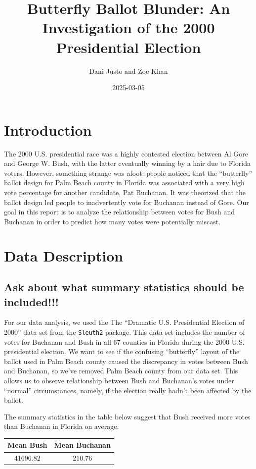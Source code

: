 \documentclass[
  letterpaper,
  DIV=11,
  numbers=noendperiod]{scrartcl}
\title{Butterfly Ballot Blunder: An Investigation of the 2000
Presidential Election}
\author{Dani Justo and Zoe Khan}
\date{2025-03-05}
\begin{document}
\maketitle

\section{Introduction}\label{introduction}

The 2000 U.S. presidential race was a highly contested election between
Al Gore and George W. Bush, with the latter eventually winning by a hair
due to Florida voters. However, something strange was afoot: people
noticed that the ``butterfly'' ballot design for Palm Beach county in
Florida was associated with a very high vote percentage for another
candidate, Pat Buchanan. It was theorized that the ballot design led
people to inadvertently vote for Buchanan instead of Gore. Our goal in
this report is to analyze the relationship between votes for Bush and
Buchanan in order to predict how many votes were potentially miscast.

\section{Data Description}\label{data-description}

\subsection{Ask about what summary statistics should be
included!!!}\label{ask-about-what-summary-statistics-should-be-included}

For our data analysis, we used the The ``Dramatic U.S. Presidential
Election of 2000'' data set from the \texttt{Sleuth2} package. This data
set includes the number of votes for Buchanan and Bush in all 67
counties in Florida during the 2000 U.S. presidential election. We want
to see if the confusing ``butterfly'' layout of the ballot used in Palm
Beach county caused the discrepancy in votes between Bush and Buchanan,
so we've removed Palm Beach county from our data set. This allows us to
observe relationship between Bush and Buchanan's votes under ``normal''
circumstances, namely, if the election really hadn't been affected by
the ballot.

The summary statistics in the table below suggest that Bush received
more votes than Buchanan in Florida on average.

\begin{table}[H]
\centering
\begin{tabular}[t]{cc}
\toprule
Mean Bush & Mean Buchanan\\
\midrule
41696.82 & 210.76\\
\bottomrule
\end{tabular}
\end{table}
\end{document}
